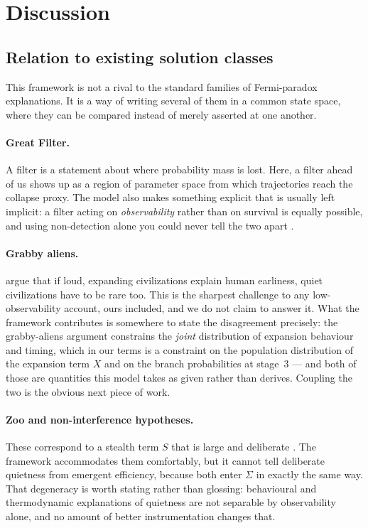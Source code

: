 \section{Discussion}
\label{sec:discussion}

\subsection{Relation to existing solution classes}

This framework is not a rival to the standard families of Fermi-paradox
explanations. It is a way of writing several of them in a common state space,
where they can be compared instead of merely asserted at one another.

\paragraph{Great Filter.} A filter is a statement about where probability mass is
lost. Here, a filter ahead of us shows up as a region of parameter space from
which trajectories reach the collapse proxy. The model also makes something
explicit that is usually left implicit: a filter acting on \emph{observability}
rather than on survival is equally possible, and using non-detection alone you
could never tell the two apart \citep{hanson1998filter,cirkovic2018}.
\Hypothetical

\paragraph{Grabby aliens.} \citet{hanson2021grabby} argue that if loud, expanding
civilizations explain human earliness, quiet civilizations have to be rare too.
This is the sharpest challenge to any low-observability account, ours included,
and we do not claim to answer it. What the framework contributes is somewhere to
state the disagreement precisely: the grabby-aliens argument constrains the
\emph{joint} distribution of expansion behaviour and timing, which in our terms
is a constraint on the population distribution of the expansion term $X$ and on
the branch probabilities at stage~3 --- and both of those are quantities this
model takes as given rather than derives. Coupling the two is the obvious next
piece of work.

\paragraph{Zoo and non-interference hypotheses.} These correspond to a stealth
term $S$ that is large and deliberate \citep{ball1973zoo,bracewell1960}. The
framework accommodates them comfortably, but it cannot tell deliberate quietness
from emergent efficiency, because both enter $\Sigma$ in exactly the same way.
That degeneracy is worth stating rather than glossing: behavioural and
thermodynamic explanations of quietness are not separable by observability
alone, and no amount of better instrumentation changes that.

